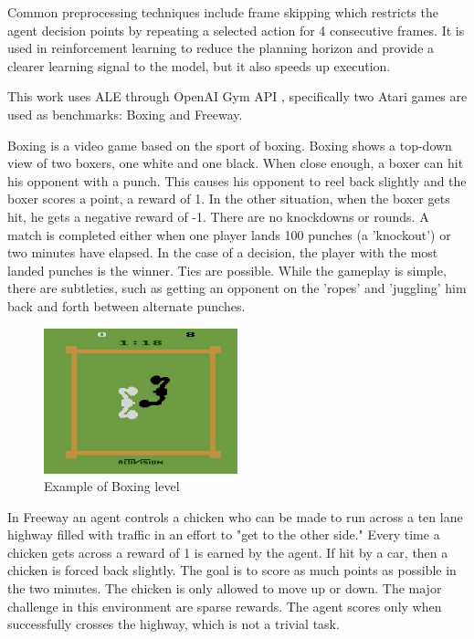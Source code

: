 Common preprocessing techniques include frame skipping \cite{Study.FrameSkipping} which restricts the agent decision points by repeating a selected action for 4 consecutive frames. It is used in reinforcement learning \cite{Algo.DQN} to reduce the planning horizon and provide a clearer learning signal to the model, but it also speeds up execution.

This work uses ALE through OpenAI Gym API \cite{Code.OpenAIGym}, specifically two Atari games are used as benchmarks: Boxing and Freeway.

Boxing is a video game based on the sport of boxing. Boxing shows a top-down view of two boxers, one white and one black. When close enough, a boxer can hit his opponent with a punch. This causes his opponent to reel back slightly and the boxer scores a point, a reward of 1. In the other situation, when the boxer gets hit, he gets a negative reward of -1. There are no knockdowns or rounds. A match is completed either when one player lands 100 punches (a 'knockout') or two minutes have elapsed. In the case of a decision, the player with the most landed punches is the winner. Ties are possible. 
While the gameplay is simple, there are subtleties, such as getting an opponent on the 'ropes' and 'juggling' him back and forth between alternate punches. 

\begin{figure}[H]
\includegraphics[width=0.5\textwidth,keepaspectratio]{figures/Boxing.jpg}
\caption[Boxing]{Example of Boxing level}
\label{Fig.Boxing}
\end{figure}

In Freeway an agent controls a chicken who can be made to run across a ten lane highway filled with traffic in an effort to "get to the other side." Every time a chicken gets across a reward of 1 is earned by the agent. If hit by a car, then a chicken is forced back slightly. The goal is to score as much points as possible in the two minutes. The chicken is only allowed to move up or down. 
The major challenge in this environment are sparse rewards. The agent scores only when successfully crosses the highway, which is not a trivial task.

